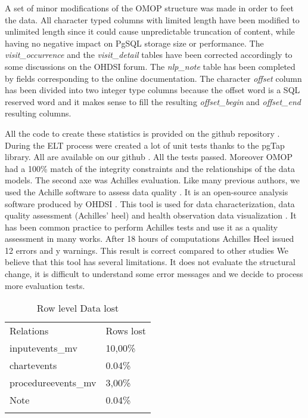 A set of minor modifications of the OMOP structure was made in order to feet
the data. All character typed columns with limited length have been modified to
unlimited length since it could cause unpredictable truncation of content,
while having no negative impact on PgSQL storage size or performance. The
\textit{visit\_occurrence} and the \textit{visit\_detail} tables have been
corrected accordingly to some discussions on the OHDSI forum. The
\textit{nlp\_note} table has been completed by fields corresponding to the
online documentation. The character \textit{offset} column has been divided
into two integer type columns because the offset word is a SQL reserved word
and it makes sense to fill the resulting \textit{offset\_begin} and
\textit{offset\_end} resulting columns.


All the code to create these statistics is provided on the github repository
\cite{mimic-omop-website}. During the ELT process were created a lot of unit
tests thanks to the pgTap library. All are available on our github
\cite{mimic-omop-website}. All the tests passed. Moreover OMOP had a 100\%
match of the integrity constraints and the relationships of the data models.
The second axe was Achilles evaluation. Like many previous authors, we used the
Achille software to assess data quality \cite{achilles-evaluation}.  It is an
open-source analysis software produced by OHDSI \cite{ohdsi-achilles}.  This
tool is used for data characterization, data quality assessment (Achilles'
heel) and health observation data visualization \cite{ohdsi-achilles}.  It has
been common practice to perform Achilles tests and use it as a quality
assessment in many works. After 18 hours of computations Achilles Heel issued
12 errors and y warnings.  This result is correct compared to other studies
\cite{achilles-evaluation} We believe that this tool has several limitations.
It does not evaluate the structural change, it is difficult to understand some
error messages and we decide to process more evaluation tests. 

\begin{table*}[t]
\caption{Row level Data lost}{
\begin{tabular}{@{}ll@{}}\toprule
Relations           & Rows lost        \\\colrule
inputevents\_mv     & 10,00\%          \\
chartevents         & 0.04\%           \\
procedureevents\_mv & 3,00\%           \\
Note                & 0.04\%           \\\botrule
\end{tabular}}
\label{table:lostrows}
\end{table*}

